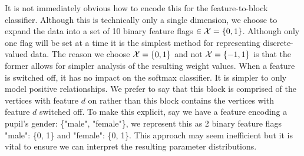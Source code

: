 It is not immediately obvious how to encode this for the feature-to-block classifier. Although this is technically only a single dimension, we choose to expand the data into a set of 10 binary feature flags $\in \mathcal{X} = \{0, 1\}$. Although only one flag will be set at a time it is the simplest method for representing discrete-valued data. The reason we choose $\mathcal{X}=\{0, 1\}$ and not $\mathcal{X} = \{-1, 1\}$ is that the former allows for simpler analysis of the resulting weight values. When a feature is switched off, it has no impact on the softmax classifier. It is simpler to only model positive relationships. We prefer to say that this block is comprised of the vertices with feature $d$ on rather than this block contains the vertices with feature $d$ switched off. To make this explicit, say we have a feature encoding a pupil's gender: \{"male", "female"\}, we represent this as 2 binary feature flags "male": \{0, 1\} and "female": \{0, 1\}. This approach may seem inefficient but it is vital to ensure we can interpret the resulting parameter distributions.

